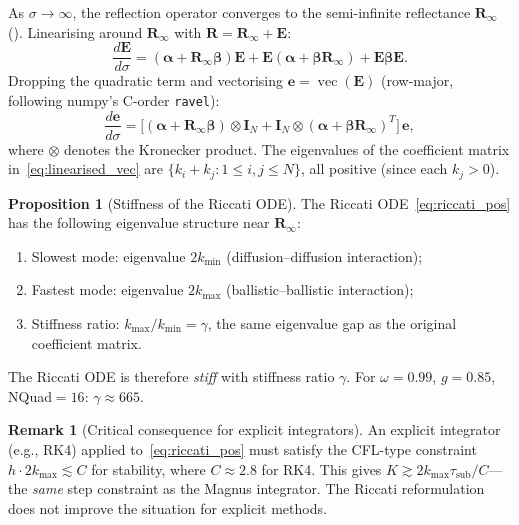 \documentclass[11pt,a4paper]{article}
\newcommand{\vect}[1]{\bm{#1}}
\newcommand{\mat}[1]{\mathbf{#1}}
\newcommand{\tsub}{\tau_{\mathrm{sub}}}
\newcommand{\kmax}{k_{\max}}
\newcommand{\kmin}{k_{\min}}
\newcommand{\Rinf}{\mat{R}_\infty}
\theoremstyle{definition}
\newtheorem{proposition}{Proposition}
\newtheorem{remark}{Remark}
\begin{document}
As $\sigma\to\infty$, the reflection operator converges to the
semi-infinite reflectance $\Rinf$ ().  Linearising
around $\Rinf$ with $\mat{R}=\Rinf+\mat{E}$:
\begin{equation}\label{eq:linearised}
  \frac{d\mat{E}}{d\sigma}
  = (\mat{\alpha}+\Rinf\mat{\beta})\mat{E}
  + \mat{E}(\mat{\alpha}+\mat{\beta}\Rinf)
  + \mat{E}\mat{\beta}\mat{E}.
\end{equation}
Dropping the quadratic term and vectorising $\vect{e}=\operatorname{vec}(\mat{E})$
(row-major, following numpy's C-order \texttt{ravel}):
\begin{equation}\label{eq:linearised_vec}
  \frac{d\vect{e}}{d\sigma}
  = \bigl[
    (\mat{\alpha}+\Rinf\mat{\beta})\otimes\mat{I}_N
    + \mat{I}_N\otimes(\mat{\alpha}+\mat{\beta}\Rinf)^T
  \bigr]\,\vect{e},
\end{equation}
where $\otimes$ denotes the Kronecker product.  The eigenvalues of
the coefficient matrix in~\eqref{eq:linearised_vec} are
$\{k_i+k_j : 1\leq i,j\leq N\}$, all positive (since
each $k_j>0$).

\begin{proposition}[Stiffness of the Riccati ODE]\label{prop:stiffness}
The Riccati ODE~\eqref{eq:riccati_pos} has the following
eigenvalue structure near $\Rinf$:
\begin{enumerate}[nosep]
\item Slowest mode: eigenvalue $2\kmin$ (diffusion--diffusion
  interaction);
\item Fastest mode: eigenvalue $2\kmax$ (ballistic--ballistic
  interaction);
\item Stiffness ratio: $\kmax/\kmin = \gamma$, the same eigenvalue gap
  as the original coefficient matrix.
\end{enumerate}
The Riccati ODE is therefore \emph{stiff} with stiffness ratio $\gamma$.
For $\omega=0.99$, $g=0.85$, NQuad${}=16$: $\gamma\approx 665$.
\end{proposition}

\begin{remark}[Critical consequence for explicit integrators]
An explicit integrator (e.g., RK4) applied to~\eqref{eq:riccati_pos}
must satisfy the CFL-type constraint $h\cdot 2\kmax \lesssim C$ for
stability, where $C\approx 2.8$ for RK4.  This gives
$K\gtrsim 2\kmax\tsub/C$---the \emph{same} step constraint as the
Magnus integrator.  The Riccati reformulation does not improve the
situation for explicit methods.
\end{remark}
\end{document}
